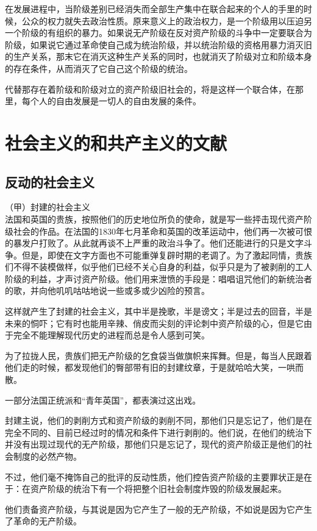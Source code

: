 \documentclass[UTF8]{ctexart}
\begin{document}
在发展进程中，当阶级差别已经消失而全部生产集中在联合起来的个人的手里的时候，公众的权力就失去政治性质。原来意义上的政治权力，是一个阶级用以压迫另一个阶级的有组织的暴力。如果说无产阶级在反对资产阶级的斗争中一定要联合为阶级，如果说它通过革命使自己成为统治阶级，并以统治阶级的资格用暴力消灭旧的生产关系，那末它在消灭这种生产关系的同时，也就消灭了阶级对立和阶级本身的存在条件，从而消灭了它自己这个阶级的统治。

代替那存在着阶级和阶级对立的资产阶级旧社会的，将是这样一个联合体，在那里，每个人的自由发展是一切人的自由发展的条件。
\section{社会主义的和共产主义的文献}
\subsection{反动的社会主义}
（甲）封建的社会主义
\\

法国和英国的贵族，按照他们的历史地位所负的使命，就是写一些抨击现代资产阶级社会的作品。在法国的1830年七月革命和英国的改革运动中，他们再一次被可恨的暴发户打败了。从此就再谈不上严重的政治斗争了。他们还能进行的只是文字斗争。但是，即使在文字方面也不可能重弹复辟时期的老调了。为了激起同情，贵族们不得不装模做样，似乎他们已经不关心自身的利益，似乎只是为了被剥削的工人阶级的利益，才声讨资产阶级。他们用来泄愤的手段是：唱唱诅咒他们的新统治者的歌，并向他叽叽咕咕地说一些或多或少凶险的预言。

这样就产生了封建的社会主义，其中半是挽歌，半是谤文；半是过去的回音，半是未来的恫吓；它有时也能用辛辣、俏皮而尖刻的评论刺中资产阶级的心，但是它由于完全不能理解现代历史的进程而总是令人感到可笑。

为了拉拢人民，贵族们把无产阶级的乞食袋当做旗帜来挥舞。但是，每当人民跟着他们走的时候，都发现他们的臀部带有旧的封建纹章，于是就哈哈大笑，一哄而散。

一部分法国正统派和“青年英国”，都表演过这出戏。

封建主说，他们的剥削方式和资产阶级的剥削不同，那他们只是忘记了，他们是在完全不同的、目前已经过时的情况和条件下进行剥削的。他们说，在他们的统治下并没有出现过现代的无产阶级，那他们只是忘记了，现代的资产阶级正是他们的社会制度的必然产物。

不过，他们毫不掩饰自己的批评的反动性质，他们控告资产阶级的主要罪状正是在于：在资产阶级的统治下有一个将把整个旧社会制度炸毁的阶级发展起来。

他们责备资产阶级，与其说是因为它产生了一般的无产阶级，不如说是因为它产生了革命的无产阶级。
\end{document}
